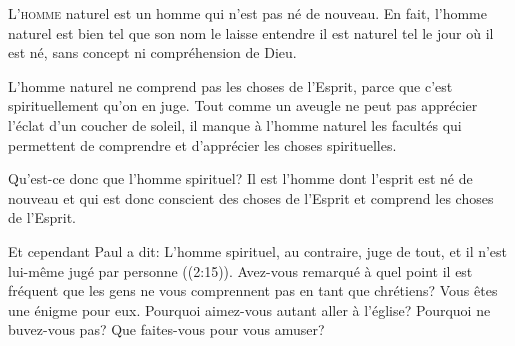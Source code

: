 \dvrule







\lettrine{L}{'homme} naturel est un homme qui n'est pas né de nouveau.
 En fait, l'homme naturel est bien tel que son nom le laisse entendre
 \ocadr il est naturel tel le jour où il est né,
 sans concept ni compréhension de Dieu.

L'homme naturel ne comprend pas les choses de l'Esprit,
 parce que c'est spirituellement qu'on en juge.
 Tout comme un aveugle ne peut pas apprécier l'éclat d'un coucher de soleil,
 il manque à l'homme naturel les facultés qui permettent
 de comprendre et d'apprécier les choses spirituelles.


Qu'est-ce donc que l'homme spirituel?
 Il est l'homme dont l'esprit est né de nouveau
 et qui est donc conscient des choses de l'Esprit
 et comprend les choses de l'Esprit.

Et cependant Paul a dit: 
 \Og L'homme spirituel, au contraire, juge de tout,
 et il n'est lui-même jugé par personne \Fg{}
 ((2:15)).
 Avez-vous remarqué à quel point il est fréquent
 que les gens ne vous comprennent
 pas en tant que chrétiens? Vous êtes une énigme pour eux.
 \Og Pourquoi aimez-vous autant aller à l'église?
 Pourquoi ne buvez-vous pas? Que faites-vous pour vous amuser? \Fg{}

